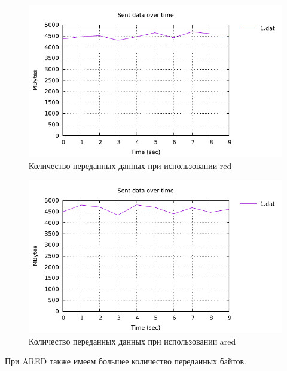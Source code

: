 \begin{figure}[!ht]
  \centering
  \includegraphics[width=0.6\linewidth]{image/red/bytes_red.pdf}
  \caption{Количество переданных данных при использовании red}
  \label{fig:3.6}
\end{figure}

\begin{figure}[!ht]
  \centering
  \includegraphics[width=0.6\linewidth]{image/ared/bytes_ared.pdf}
  \caption{Количество переданных данных при использовании ared}
  \label{fig:3.7}
\end{figure}

При ARED также имеем большее количество переданных байтов. 


